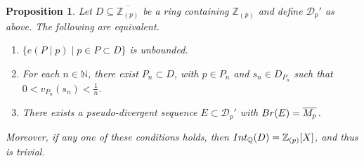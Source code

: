 \documentclass{article}
\newtheorem{Prop}[equation]{Proposition}
\theoremstyle{definition}\newtheorem{Def}[equation]{Definition}
\theoremstyle{definition}\newtheorem{Ques}[equation]{Question}
\theoremstyle{definition}\newtheorem{Conj}[equation]{Conjecture}
\theoremstyle{definition}\newtheorem{Not}[equation]{Notation}
\newcommand{\N}{\mathbb{N}}
\newcommand{\Q}{\mathbb{Q}}
\newcommand{\Z}{\mathbb{Z}}
\newcommand{\Int}{\textnormal{Int}}
\newcommand{\IntQ}{\Int_{\Q}}
\newcommand{\Br}{\textnormal{Br}}
\numberwithin{equation}{section}
\newcommand\bc { \color{blue}}
\begin{document}
\begin{Prop}\label{triviality unbounded ramification}
Let $D\subseteq\overline{\Z_{(p)}}$ be a ring containing $\Z_{(p)}$ and define $\mathcal{D}_p'$ as above. The following are equivalent.
\begin{enumerate}[(1)]
\item $\{e(P\mid p)\mid p\in P\subset D\}$ is unbounded.
\item For each $n\in\N$, there exist $P_n\subset D$, with $p\in P_n$ and $s_n\in D_{P_n}$ such that $0<v_{P_n}(s_n)<\frac{1}{n}$.
\item There exists a pseudo-divergent sequence $E\subset\mathcal{D}_p'$ with $\Br(E)=\overline{M_p}$.
\end{enumerate}
Moreover, if any one of these conditions holds, then $\IntQ(D)=\Z_{(p)}[X]$, and thus is trivial.
\end{Prop}
\end{document}
